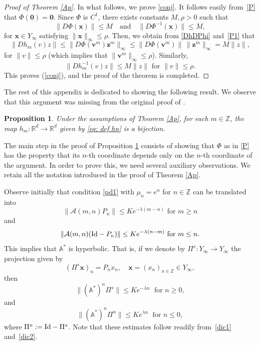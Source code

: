\documentclass[reqno, a4paper, 10pt]{amsart}
\theoremstyle{plain}
\numberwithin{equation}{section}
\newtheorem{proposition}{Proposition}
\theoremstyle{remark}
\def\R{\mathbb{R}}
\def\Id{\text{\rm Id}}
\def\Z{\mathbb{Z}}
\begin{document}
\begin{proof}[Proof of Theorem \ref{Ap}]
In what follows, we prove \eqref{conj}.
It follows easily from~\eqref{P} that $\Phi(\mathbf 0)=\mathbf 0$.
Since $\Phi$ is $C^1$, there exists constants $M, \rho>0$ such that
\begin{equation}\label{P1}
\|D\Phi(\mathbf x)\| \le M \quad  \text{and} \quad  \|D\Phi^{-1}(\mathbf x)\|\le M, 
\end{equation}
for $\mathbf x\in Y_\infty$ satisfying $\|\mathbf x\|_\infty \le \rho$.
Then, we obtain from \eqref{DhDPhi} and~\eqref{P1} that
\[
\|D h_m(v)z\|\le \|D\Phi(\mathbf v^m)\mathbf z^m\|_\infty
\le \|D\Phi(\mathbf v^m)\|\,\|\mathbf z^m\|_\infty
=M\|z\|,
\]
for $\|v\| \le \rho$ (which implies that $\|\mathbf v^m\|_\infty\le \rho$). Similarly,
\[
\|D h_m^{-1}(v)z\|\le M\|z\|  \text{ for $\|v\|\le \rho$.}
\]
This proves (\ref{conj}), and the proof of the theorem is completed.
\end{proof}



The rest of this appendix is dedicated to showing the following result. We observe that this argument was missing from the original proof of \cite[Theorem 2]{DZZ}.
\begin{proposition}\label{prop: hn is homeo}
Under the assumptions of Theorem \ref{Ap}, for each $m\in \Z$, the map $h_m\colon \R^d \to \R^d$ given by \eqref{eq: def hn} is a bijection.
\end{proposition}


The main step in the proof of Proposition \ref{prop: hn is homeo} consists of showing that $\Phi$ as in \eqref{P} has the property that its $n$-th coordinate depends only on the $n$-th coordinate of the argument. In order to prove this, we need several auxiliary observations. We retain all the notation introduced in the proof of Theorem \ref{Ap}.


Observe initially that condition \eqref{pd1} with $\mu_n=e^n$ for $n\in \Z$ can be translated into
\begin{equation}\label{dic1}
\|\mathcal A(m, n)P_n\|\le Ke^{-\lambda (m-n)} \text{ for $m\ge n$}
\end{equation}
and
\begin{equation}\label{dic2}
\|\mathcal A(m, n)(\Id-P_n)\|\le K e^{-\lambda (n-m)} \text{ for $m\le n$.}
\end{equation}
This implies that $\mathbb A^\ast $ is hyperbolic. That is, if we denote by $\Pi^s\colon Y_\infty \to Y_\infty$ the projection given by 
\[
(\Pi^s \mathbf x)_n=P_n x_n, \quad \mathbf x=(x_n)_{n\in \mathbb Z}\in Y_\infty,
\]
then
\[
\|(\mathbb A^\ast)^n \Pi^s\|\le Ke^{-\lambda n} \; \text{ for } n\ge 0,
\]
and 
\[
\|(\mathbb A^\ast)^{n}\Pi^u\|\le Ke^{\lambda n} \; \text{ for } n\le 0,
\]
where $\Pi^u:=\Id-\Pi^s$. Note that these estimates follow readily from~\eqref{dic1} and~\eqref{dic2}.
\end{document}
